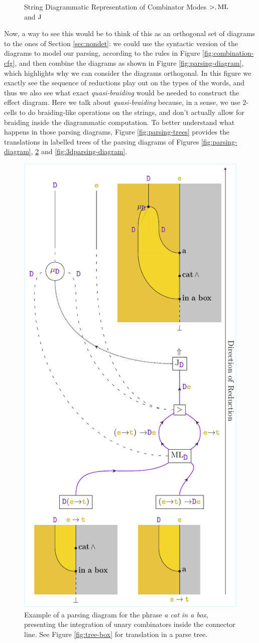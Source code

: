 \begin{figure}
	\centering
	
	\caption{String Diagrammatic Representation of Combinator Modes $>, \text{ML}$ and $\text{J}$}
	\label{fig:combinator-sd}
\end{figure}

Now, a way to see this would be to think of this as an orthogonal set of
diagrams to the ones of Section \ref{sec:nondet}: we could use the syntactic
version of the diagrams to model our parsing, according to the rules in
Figure \ref{fig:combination-cfg}, and then combine the diagrams as shown in
Figure \ref{fig:parsing-diagram}, which highlights why we can consider the
diagrams orthogonal.
In this figure we exactly see the sequence of reductions play out on the types
of the words, and thus we also see what exact \emph{quasi-braiding} would be
needed to construct the effect diagram.
Here we talk about \emph{quasi-braiding} because, in a sense, we use $2$-cells
to do braiding-like operations on the strings, and don't actually allow for
braiding inside the diagrammatic computation.
To better understand what happens in those parsing diagrams, Figure
\ref{fig:parsing-trees} provides the translations in labelled trees of the
parsing diagrams of Figures \ref{fig:parsing-diagram},
\ref{fig:parsing-diagram2} and \ref{fig:3dparsing-diagram}.

\begin{figure}
	\centering
	\includegraphics[width=.45\textwidth]{aux/figures/parsing-diagram2.pdf}
	\caption{Example of a parsing diagram for the phrase
		\emph{a cat in a box}, presenting the integration of unary combinators
		inside the connector line. See Figure \ref{fig:tree-box} for translation in
		a parse tree.}
	\label{fig:parsing-diagram2}
\end{figure}

